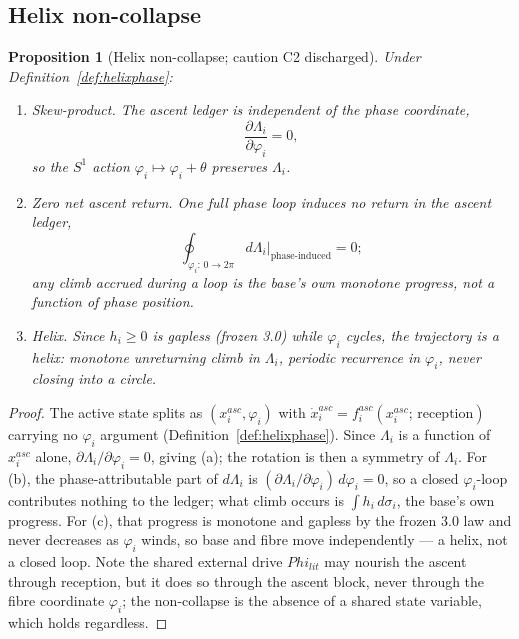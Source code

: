 \documentclass[11pt,a4paper]{article}
\def\Phi{Phi}%
\def\mathrm#1{#1}%
\def\emph#1{#1}%
\theoremstyle{definition}
\theoremstyle{plain}
\newtheorem{proposition}[definition]{Proposition}
\theoremstyle{remark}
\begin{document}
\subsection{Helix non-collapse}

\begin{proposition}[Helix non-collapse; caution C2 discharged]\label{prop:noncollapse}
Under Definition~\ref{def:helixphase}:
\begin{enumerate}[label=\textup{(\alph*)},leftmargin=1.2cm]
\item \emph{Skew-product.} The ascent ledger is independent of the phase coordinate,
\[
\frac{\partial\Lambda_i}{\partial\varphi_i}=0,
\]
so the \(S^1\) action \(\varphi_i\mapsto\varphi_i+\theta\) preserves \(\Lambda_i\).
\item \emph{Zero net ascent return.} One full phase loop induces no return in the ascent
ledger,
\[
\oint_{\varphi_i:\,0\to2\pi} d\Lambda_i\Big|_{\text{phase-induced}}=0;
\]
any climb accrued during a loop is the base's own monotone progress, not a function of phase
position.
\item \emph{Helix.} Since \(h_i\ge0\) is gapless (frozen 3.0) while \(\varphi_i\) cycles, the
trajectory is a helix: monotone unreturning climb in \(\Lambda_i\), periodic recurrence in
\(\varphi_i\), never closing into a circle.
\end{enumerate}
\end{proposition}

\begin{proof}
The active state splits as \((x_i^{\mathrm{asc}},\varphi_i)\) with
\(\dot x_i^{\mathrm{asc}}=f_i^{\mathrm{asc}}(x_i^{\mathrm{asc}};\,\text{reception})\) carrying
no \(\varphi_i\) argument (Definition~\ref{def:helixphase}). Since \(\Lambda_i\) is a function
of \(x_i^{\mathrm{asc}}\) alone, \(\partial\Lambda_i/\partial\varphi_i=0\), giving (a); the
rotation is then a symmetry of \(\Lambda_i\). For (b), the phase-attributable part of
\(d\Lambda_i\) is \((\partial\Lambda_i/\partial\varphi_i)\,d\varphi_i=0\), so a closed
\(\varphi_i\)-loop contributes nothing to the ledger; what climb occurs is
\(\int h_i\,d\sigma_i\), the base's own progress. For (c), that progress is monotone and
gapless by the frozen 3.0 law and never decreases as \(\varphi_i\) winds, so base and fibre
move independently --- a helix, not a closed loop. Note the shared external drive
\(\Phi_{\mathrm{lit}}\) may nourish the ascent through reception, but it does so through the
ascent block, never through the fibre coordinate \(\varphi_i\); the non-collapse is the
absence of a shared \emph{state variable}, which holds regardless. \qedhere
\end{proof}
\end{document}
